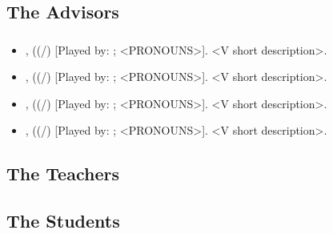 \documentclass[blue]{GL2020}
\begin{document}
\name{\bDramatisPersonae{}}

\subsection*{The Advisors}
\subsubsection*{\pFarm{}}
\begin{itemize}
	\item \cHedonist{\full}, ((\cHedonist{\they}/\cHedonist{\them}) [Played by: \cHedonist{\MYplayer}; <PRONOUNS>].  <V short description>.
	\item \cWildCard{\full}, ((\cWildCard{\they}/\cWildCard{\them}) [Played by: \cWildCard{\MYplayer}; <PRONOUNS>].  <V short description>.
	\item \cEvil{\full}, ((\cEvil{\they}/\cEvil{\them}) [Played by: \cEvil{\MYplayer}; <PRONOUNS>].  <V short description>.
	\item \cCurse{\full}, ((\cCurse{\they}/\cCurse{\them}) [Played by: \cCurse{\MYplayer}; <PRONOUNS>].  <V short description>.
\end{itemize}
\subsubsection*{\pTech{}}
\subsubsection*{\pShip{}}

\subsection*{The Teachers}
\subsubsection*{\pFarm{}}
\subsubsection*{\pTech{}}
\subsubsection*{\pShip{}}

\subsection*{The Students}
\subsubsection*{\pFarm{}}
\subsubsection*{\pTech{}}
\subsubsection*{\pShip{}}
\end{document}

